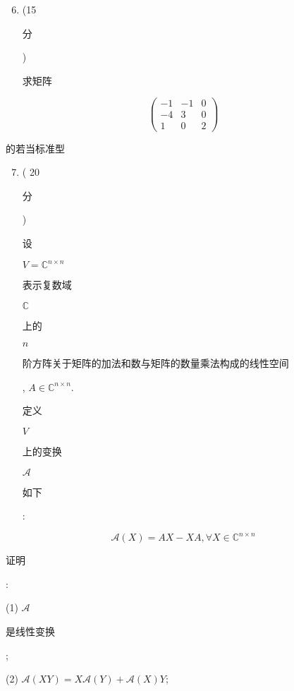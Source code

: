\documentclass[10pt]{article}
\begin{document}
\begin{enumerate}
  \setcounter{enumi}{5}
  \item (15 \begin{CJK}{UTF8}{mj}分\end{CJK}) \begin{CJK}{UTF8}{mj}求矩阵\end{CJK}
\end{enumerate}
$$
\left(\begin{array}{ccc}
-1 & -1 & 0 \\
-4 & 3 & 0 \\
1 & 0 & 2
\end{array}\right)
$$
\begin{CJK}{UTF8}{mj}的若当标准型\end{CJK}

\begin{enumerate}
  \setcounter{enumi}{6}
  \item ( 20 \begin{CJK}{UTF8}{mj}分\end{CJK}) \begin{CJK}{UTF8}{mj}设\end{CJK} $V=\mathbb{C}^{n \times n}$ \begin{CJK}{UTF8}{mj}表示复数域\end{CJK} $\mathbb{C}$ \begin{CJK}{UTF8}{mj}上的\end{CJK} $n$ \begin{CJK}{UTF8}{mj}阶方阵关于矩阵的加法和数与矩阵的数量乘法构成的线性空间\end{CJK}, $A \in \mathbb{C}^{n \times n}$. \begin{CJK}{UTF8}{mj}定义\end{CJK} $V$ \begin{CJK}{UTF8}{mj}上的变换\end{CJK} $\mathscr{A}$ \begin{CJK}{UTF8}{mj}如下\end{CJK}:
\end{enumerate}
$$
\mathscr{A}(X)=A X-X A, \forall X \in \mathbb{C}^{n \times n}
$$
\begin{CJK}{UTF8}{mj}证明\end{CJK}:

(1) $\mathscr{A}$ \begin{CJK}{UTF8}{mj}是线性变换\end{CJK};

(2) $\mathscr{A}(X Y)=X \mathscr{A}(Y)+\mathscr{A}(X) Y$;
\end{document}
